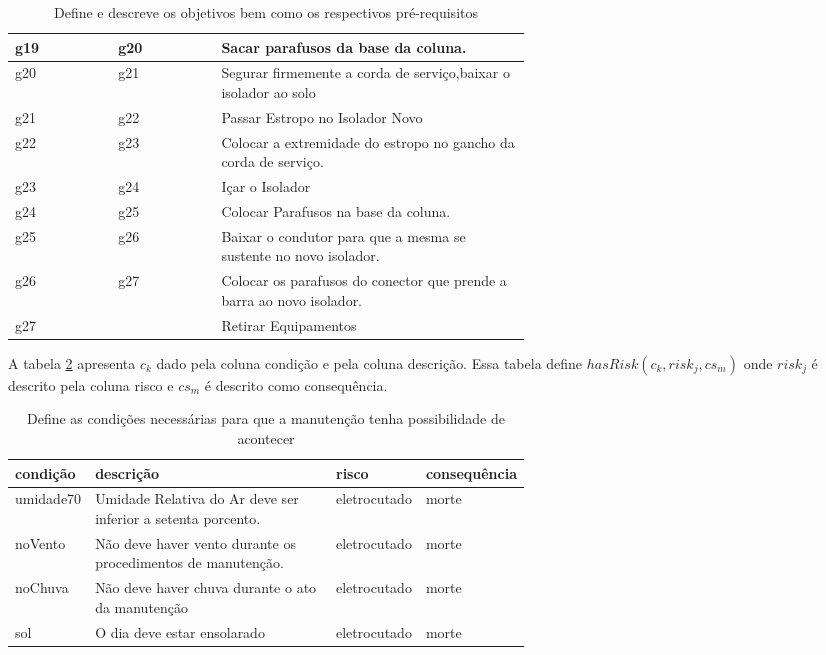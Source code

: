 \begin{table}[H]
\begin{tabular}{|l|l|p{0.6\linewidth}|}
g19 & g20 & Sacar parafusos da base da coluna. \\ \hline
g20 & g21 & Segurar firmemente a corda de serviço,baixar o isolador ao solo \\ \hline
g21 & g22 & Passar Estropo no Isolador Novo \\ \hline
g22 & g23 & Colocar a extremidade do estropo no gancho da corda de serviço. \\ \hline
g23 & g24 & Içar o Isolador \\ \hline
g24 & g25 & Colocar Parafusos na base da coluna. \\ \hline
g25 & g26 & Baixar o condutor para que a mesma se sustente no novo isolador. \\ \hline
g26 & g27 & Colocar os parafusos do conector que prende a barra ao novo isolador. \\ \hline
g27 &     & Retirar Equipamentos \\ \hline
\end{tabular}
\caption{Define e descreve os objetivos bem como os respectivos pré-requisitos}
\label{g}
\end{table}

A tabela \ref{condition} apresenta $c_k$ dado pela coluna condição e pela coluna descrição. 
Essa tabela define $hasRisk(c_k,risk_j,cs_m)$ onde $risk_j$ é descrito pela coluna risco e $cs_m$ é descrito como consequência. 

\begin{table}[H]
\centering
\begin{tabular}{|l|p{0.6\linewidth}|l|l|}
\hline
\textbf{condição} & \textbf{descrição} & \textbf{risco} & \textbf{consequência} \\ \hline
umidade70 & Umidade Relativa do Ar deve ser inferior a setenta porcento. & eletrocutado & morte \\ \hline
noVento & Não deve haver vento durante os procedimentos de manutenção. & eletrocutado & morte \\ \hline
noChuva & Não deve haver chuva durante o ato da manutenção & eletrocutado & morte \\ \hline
sol & O dia deve estar ensolarado & eletrocutado & morte \\ \hline
\end{tabular}
\caption{Define as condições necessárias para que a manutenção tenha possibilidade de acontecer}
\label{condition}
\end{table}


